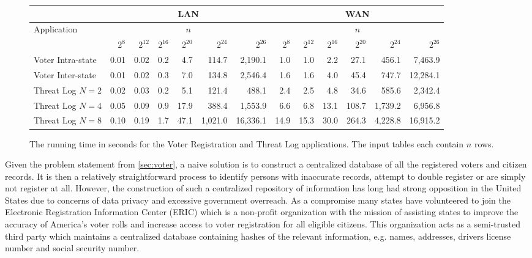 \begin{figure*}[t!]\centering\footnotesize
	\begin{tabular}{|l|| r | r |r |r|r|r||r|r | r |r |r|r|}
		\cline{2-13}
		\multicolumn{1}{c}{}         & \multicolumn{6}{|c||}{LAN}                                   & \multicolumn{6}{|c|}{WAN}                                    \\ \hline
		\multirow{2}{*}{Application} &                  \multicolumn{6}{c||}{$n$}                   &                   \multicolumn{6}{c|}{$n$}                   \\
		& $2^8$ & $2^{12}$ & $2^{16}$ & $2^{20}$ & $2^{24}$ & $2^{26}$ & $2^8$ & $2^{12}$ & $2^{16}$ & $2^{20}$ & $2^{24}$ & $2^{26}$ \\ \hline\hline
		Voter Intra-state            & 0.01  & 0.02     & 0.2      & 4.7      &    114.7 &  2,190.1 &   1.0 &      1.0 & 2.2      & 27.1     & 456.1    &  7,463.9 \\ \hline
		Voter Inter-state            & 0.01  & 0.02     & 0.3      & 7.0      &    134.8 &  2,546.4 &   1.6 &      1.6 & 4.0      & 45.4     & 747.7    & 12,284.1 \\ \hline
		Threat Log $N=2$          & 0.02  & 0.03     & 0.2      & 5.1      &    121.4 &    488.1 &   2.4 &      2.5 & 4.8      & 34.6     & 585.6    &  2,342.4 \\ \hline
		Threat Log $N=4$           & 0.05  & 0.09     & 0.9      & 17.9     &    388.4 &  1,553.9 &   6.6 &      6.8 & 13.1     & 108.7    & 1,739.2  &  6,956.8 \\ \hline
		Threat Log $N=8$          & 0.10  & 0.19     & 1.7      & 47.1     &  1,021.0 & 16,336.1 &  14.9 &     15.3 & 30.0     & 264.3    & 4,228.8  & 16,915.2 \\ \hline
	\end{tabular}
\vspace{-0.3cm}
	\caption{\label{fig:app} The running time in seconds for the Voter Registration and Threat Log applications. The input tables each contain $n$ rows.  }
	\vspace{-0.3cm}
\end{figure*}

Given the problem statement from \ref{sec:voter}, a naive solution is to construct a centralized database of all the registered voters and citizen records. It is then a relatively straightforward process to identify persons with inaccurate records, attempt to double register or are simply not register at all. However, the construction of such a centralized repository of information has long had strong opposition in the United States due to concerns of data privacy and  excessive government overreach. As a compromise many states have volunteered to join the Electronic Registration Information Center (ERIC)\cite{eric} which is a non-profit organization with the mission of assisting states to improve the accuracy of America’s voter rolls and increase access to voter registration for all eligible citizens. This organization acts as a semi-trusted third party which maintains a centralized database containing hashes of the relevant information, e.g. names, addresses, drivers license number and social security number. 
\fi

